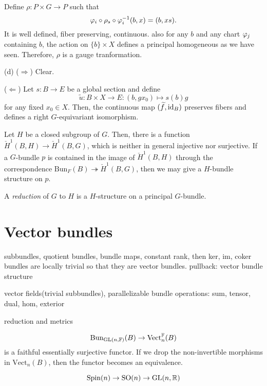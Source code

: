 \documentclass{../../large}
\begin{document}
\begin{pf}
Define $\rho:P\times G\to P$ such that
\[\varphi_i\circ\rho_s\circ\varphi_i^{-1}(b,x)=(b,xs).\]
It is well defined, fiber preserving, continuous.
also for any $b$ and any chart $\varphi_j$ containing $b$, the action on $\{b\}\times X$ defines a principal homogeneous as we have seen.
Therefore, $\rho$ is a gauge tranformation.

(d)
($\Rightarrow$)
Clear.

($\Leftarrow$)
Let $s:B\to E$ be a global section and define
\[\tilde u:B\times X\to E:(b,gx_0)\mapsto s(b)g\]
for any fixed $x_0\in X$.
Then, the continuous map $(\widetilde f,\operatorname{id}_B)$ preserves fibers and defines a right $G$-equivariant isomorphism.
\end{pf}

\begin{prb}

\end{prb}


\begin{prb}
Let $H$ be a closed subgroup of $G$.
Then, there is a function $\check H^1(B,H)\to\check H^1(B,G)$, which is neither in general injective nor surjective.
If a $G$-bundle $p$ is contained in the image of $\check H^1(B,H)$ through the correspondence $\mathrm{Bun}_F(B)\twoheadrightarrow\check H^1(B,G)$, then we may give a $H$-bundle structure on $p$.

A \emph{reduction} of $G$ to $H$ is a $H$-structure on a principal $G$-bundle.
\end{prb}






\section{Vector bundles}
subbundles, quotient bundles, bundle maps,
constant rank, then ker, im, coker bundles are locally trivial so that they are vector bundles.
pullback: vector bundle structure

vector fields(trivial subbundles), parallelizable
bundle operations: sum, tensor, dual, hom, exterior

reduction and metrics


\[\mathrm{Bun}_{\mathrm{GL}(n,\mathbb{F})}(B)\to\mathrm{Vect}_n^{\mathbb{F}}(B)\]
is a faithful essentially surjective functor.
If we drop the non-invertible morphisms in $\mathrm{Vect}_n(B)$, then the functor becomes an equivalence.

\[\mathrm{Spin}(n)\to\mathrm{SO}(n)\to\mathrm{GL}(n,\mathbb{R})\]
\end{document}
